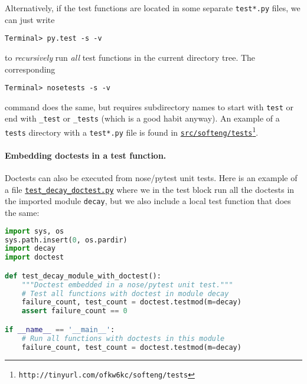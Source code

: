 \documentclass[graybox,sectrefs,envcountresetchap,open=right,final]{svmonodo}
\begin{document}
Alternatively, if the test functions are located in some separate
\texttt{test*.py} files,
we can just write



\begin{Verbatim}[frame=lines,label=\fbox{{\tiny Terminal}},framesep=2.5mm,framerule=0.7pt,fontsize=\fontsize{9pt}{9pt}]
Terminal> py.test -s -v

\end{Verbatim}

to \emph{recursively} run \emph{all} test functions in the current
directory tree. The corresponding



\begin{Verbatim}[frame=lines,label=\fbox{{\tiny Terminal}},framesep=2.5mm,framerule=0.7pt,fontsize=\fontsize{9pt}{9pt}]
Terminal> nosetests -s -v

\end{Verbatim}

command does the same, but requires subdirectory names to start
with \texttt{test} or end with \Verb!_test! or \Verb!_tests! (which is a good habit anyway).
An example of a \texttt{tests} directory with a \texttt{test*.py}
file is found in \href{{http://tinyurl.com/ofkw6kc/softeng/tests}}{\nolinkurl{src/softeng/tests}\footnote{\texttt{http://tinyurl.com/ofkw6kc/softeng/tests}}}.


\paragraph{Embedding doctests in a test function.}
Doctests can also be executed from nose/pytest unit tests. Here is an
example of a file \href{{http://tinyurl.com/ofkw6kc/softeng/tests/test_decay_doctest.py}}{\nolinkurl{test_decay_doctest.py}} where we in the test
block run all the doctests in the imported module \texttt{decay}, but we also
include a local test function that does the same:
















\begin{lstlisting}[language=python,style=blue1bar_bluegreen]
import sys, os
sys.path.insert(0, os.pardir)
import decay
import doctest

def test_decay_module_with_doctest():
    """Doctest embedded in a nose/pytest unit test."""
    # Test all functions with doctest in module decay
    failure_count, test_count = doctest.testmod(m=decay)
    assert failure_count == 0

if __name__ == '__main__':
    # Run all functions with doctests in this module
    failure_count, test_count = doctest.testmod(m=decay)

\end{lstlisting}
\end{document}
